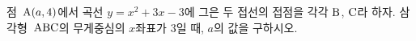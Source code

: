 점~$\mathrm{A}(a{,}\mkern3mu\mathopen{}4)$에서 곡선 $y=x^2+3x-3$에 그은 두 접선의 접점을 각각 $\mathrm{B}$, $\mathrm{C}$라 하자. 삼각형~$\mathrm{ABC}$의 무게중심의 $x$좌표가 $3$일 때, $a$의 값을 구하시오.

